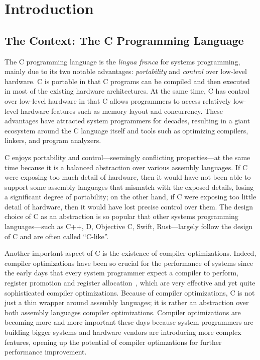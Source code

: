 \section{Introduction}
\label{sec:introduction}

\subsection{The Context: The C Programming Language}

The C programming language is the \emph{lingua franca} for systems programming, mainly due to its
two notable advantages: \emph{portability} and \emph{control} over low-level hardware.  C is
portable in that C programs can be compiled and then executed in most of the existing hardware
architectures.  At the same time, C has control over low-level hardware in that C allows programmers
to access relatively low-level hardware features such as memory layout and concurrency.  These
advantages have attracted system programmers for decades, resulting in a giant ecosystem around the
C language itself and tools such as optimizing compilers, linkers, and program analyzers.

C enjoys portability and control---seemingly conflicting properties---at the same time because it is
a balanced abstraction over various assembly languages.  If C were exposing too much detail of
hardware, then it would have not been able to support some assembly languages that mismatch with the
exposed details, losing a significant degree of portability; on the other hand, if C were exposing
too little detail of hardware, then it would have lost precise control over them.  The design choice
of C as an abstraction is so popular that other systems programming languages---such as C++, D,
Objective C, Swift, Rust---largely follow the design of C and are often called ``C-like''.

Another important aspect of C is the existence of compiler optimizations.  Indeed, compiler
optimizations have been so crucial for the performance of systems since the early days that every
system programmer expect a compiler to perform, \eg{} register promotion and register
allocation~\cite{reg-prom, reg-alloc}, which are very effective and yet quite sophisticated compiler
optimizations.  Because of compiler optimizations, C is not just a thin wrapper around assembly
languages; it is rather an abstraction over both assembly languages compiler optimizations.
Compiler optimizations are becoming more and more important these days because system programmers
are building bigger systems and hardware vendors are introducing more complex features, opening up
the potential of compiler optimzations for further performance improvement.

